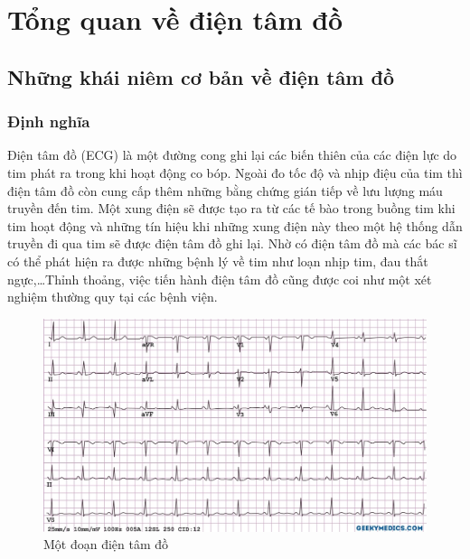 \chapter{Tổng quan về điện tâm đồ}
\thispagestyle{fancy}

\section{Những khái niêm cơ bản về điện tâm đồ}
\subsection{Định nghĩa}
Điện tâm đồ (ECG) là một đường cong ghi lại các biến thiên của các điện lực do tim phát ra trong khi hoạt động co bóp. Ngoài đo tốc độ và nhịp điệu của tim thì điện tâm đồ còn cung cấp thêm những bằng chứng gián tiếp về lưu lượng máu truyền đến tim. Một xung điện sẽ được tạo ra từ các tế bào trong buồng tim khi tim hoạt động và những tín hiệu khi những xung điện này theo một hệ thống dẫn truyền đi qua tim sẽ được điện tâm đồ ghi lại. Nhờ có điện tâm đồ mà các bác sĩ có thể phát hiện ra được những bệnh lý về tim như loạn nhịp tim, đau thắt ngực,…Thỉnh thoảng, việc tiến hành điện tâm đồ cũng được coi như một xét nghiệm thường quy tại các bệnh viện.
\begin{center}
    \begin{figure}[htp]
    \begin{center}
     \includegraphics[scale=.35]{image/chapter1/Normal-ECG-SCALED-DOWN-WATERMARK.jpg}
    \end{center}
    \caption{Một đoạn điện tâm đồ }
    \end{figure}
\end{center}

